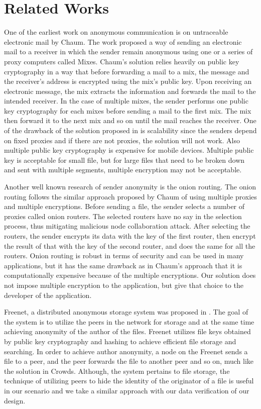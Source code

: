 \section{Related Works}\label{sec-related-works}
One of the earliest work on anonymous communication is on untraceable
electronic mail by Chaum\cite{DBLP:journals/cacm/Chaum81}. The work proposed
a way of sending an electronic mail to a receiver in which the sender
remain anonymous using one or a series of proxy computers called Mixes.
Chaum's solution relies heavily on public key cryptography in a way that
before forwarding a mail to a mix, the message and the receiver's address
is encrypted using the mix's public key. Upon receiving an electronic
message, the mix extracts the information
and forwards the mail to the intended receiver. In the case of multiple
mixes, the sender performs one public key cryptography for each mixes before
sending a mail to the first mix. The mix then forward it to the next mix
and so on until the mail reaches the receiver. One of the drawback of the
solution proposed in \cite{DBLP:journals/cacm/Chaum81} is scalability since
the senders depend on fixed proxies and if there are not proxies, the
solution will not work. Also multiple public key cryptography is expensive
for mobile devices. Multiple public key is acceptable for small file, but
for large files that need to be broken down and sent with multiple segments,
multiple encryption may not be acceptable.

Another well known research of sender anonymity is the
onion routing\cite{DBLP:conf/uss/DingledineMS04}. The onion routing
follows the similar approach proposed by Chaum of
using multiple proxies and multiple encryptions. Before sending a file,
the sender selects a number of proxies called onion routers. The selected
routers have no say in the selection process, thus mitigating malicious
node collaboration attack. After selecting the routers, the sender
encrypts its data with the key of the first router, then encrypt the result
of that with the key of the second router, and does the same for all the
routers. Onion routing is robust in terms
of security and can be used in many applications, but it has the same
drawback as in Chaum's approach that it is computationally expensive
because of the multiple encryptions. Our solution does not impose multiple
encryption to the application, but give that choice to the developer
of the application.

Freenet, a distributed anonymous storage system was proposed
in \cite{DBLP:conf/diau/ClarkeSWH00}. The goal of the system is to utilize
the peers in the network for storage and at the same time achieving anonymity
of the author of the files. Freenet utilizes file keys obtained by public
key cryptography and hashing to achieve efficient file storage and searching.
In order to achieve author anonymity, a node on the Freenet sends a file
to a peer, and the peer forwards the file to another peer and so on, much
like the solution in Crowds. Although, the system pertains to file storage,
the technique of utilizing peers to hide the identity of the originator of
a file is useful in our scenario and we take a similar approach with our
data verification of our design.

